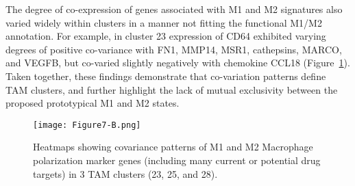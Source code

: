 The degree of co-expression of genes associated with M1 and M2 signatures also varied widely within clusters in a manner not fitting the functional M1/M2 annotation.
For example, in cluster 23 expression of CD64 exhibited varying degrees of positive co-variance with FN1, MMP14, MSR1, cathepsins, MARCO, and VEGFB, but co-varied slightly negatively with chemokine CCL18 (Figure~\ref{fig:7b}).
Taken together, these findings demonstrate that co-variation patterns define TAM clusters, and further highlight the lack of mutual exclusivity between the proposed prototypical M1 and M2 states.

\begin{figure}
\centering
\texttt{[image: Figure7-B.png]}
\caption{Heatmaps showing covariance patterns of M1 and M2 Macrophage polarization marker genes (including many current or potential drug targets) in 3 TAM clusters (23, 25, and 28).
}
\label{fig:7b}
\end{figure}

